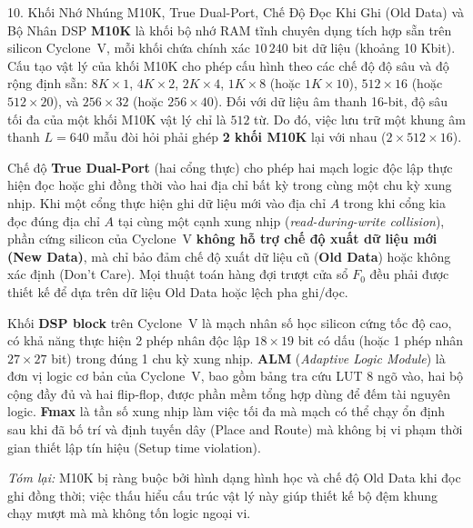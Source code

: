 \begin{feynmanbox}{10. Khối Nhớ Nhúng M10K, True Dual-Port, Chế Độ Đọc Khi Ghi (Old Data) và Bộ Nhân DSP}
\textbf{M10K} là khối bộ nhớ RAM tĩnh chuyên dụng tích hợp sẵn trên silicon Cyclone~V, mỗi khối chứa chính xác $10\,240$ bit dữ liệu (khoảng 10 Kbit). Cấu tạo vật lý của khối M10K cho phép cấu hình theo các chế độ độ sâu và độ rộng định sẵn: $8K \times 1$, $4K \times 2$, $2K \times 4$, $1K \times 8$ (hoặc $1K \times 10$), $512 \times 16$ (hoặc $512 \times 20$), và $256 \times 32$ (hoặc $256 \times 40$). Đối với dữ liệu âm thanh 16-bit, độ sâu tối đa của một khối M10K vật lý chỉ là $512$ từ. Do đó, việc lưu trữ một khung âm thanh $L = 640$ mẫu đòi hỏi phải ghép \textbf{2 khối M10K} lại với nhau ($2 \times 512 \times 16$).

Chế độ \textbf{True Dual-Port} (hai cổng thực) cho phép hai mạch logic độc lập thực hiện đọc hoặc ghi đồng thời vào hai địa chỉ bất kỳ trong cùng một chu kỳ xung nhịp. Khi một cổng thực hiện ghi dữ liệu mới vào địa chỉ $A$ trong khi cổng kia đọc đúng địa chỉ $A$ tại cùng một cạnh xung nhịp (\emph{read-during-write collision}), phần cứng silicon của Cyclone~V \textbf{không hỗ trợ chế độ xuất dữ liệu mới (New Data)}, mà chỉ bảo đảm chế độ xuất dữ liệu cũ (\textbf{Old Data}) hoặc không xác định (Don't Care). Mọi thuật toán hàng đợi trượt cửa sổ $F_0$ đều phải được thiết kế để dựa trên dữ liệu Old Data hoặc lệch pha ghi/đọc.

Khối \textbf{DSP block} trên Cyclone~V là mạch nhân số học silicon cứng tốc độ cao, có khả năng thực hiện 2 phép nhân độc lập $18\times19$ bit có dấu (hoặc 1 phép nhân $27\times27$ bit) trong đúng 1 chu kỳ xung nhịp. \textbf{ALM} (\emph{Adaptive Logic Module}) là đơn vị logic cơ bản của Cyclone~V, bao gồm bảng tra cứu LUT 8 ngõ vào, hai bộ cộng đầy đủ và hai flip-flop, được phần mềm tổng hợp dùng để đếm tài nguyên logic. \textbf{Fmax} là tần số xung nhịp làm việc tối đa mà mạch có thể chạy ổn định sau khi đã bố trí và định tuyến dây (Place and Route) mà không bị vi phạm thời gian thiết lập tín hiệu (Setup time violation).

\emph{Tóm lại:} M10K bị ràng buộc bởi hình dạng hình học và chế độ Old Data khi đọc ghi đồng thời; việc thấu hiểu cấu trúc vật lý này giúp thiết kế bộ đệm khung chạy mượt mà mà không tốn logic ngoại vi.
\end{feynmanbox}

